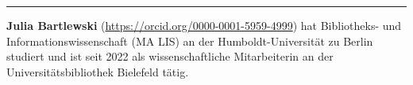 \begin{center}\rule{0.5\linewidth}{0.5pt}\end{center}

\textbf{Julia Bartlewski} (\url{https://orcid.org/0000-0001-5959-4999})
hat Bibliotheks- und Informationswissenschaft (MA LIS) an der
Humboldt-Universität zu Berlin studiert und ist seit 2022 als
wissenschaftliche Mitarbeiterin an der Universitätsbibliothek Bielefeld
tätig.
